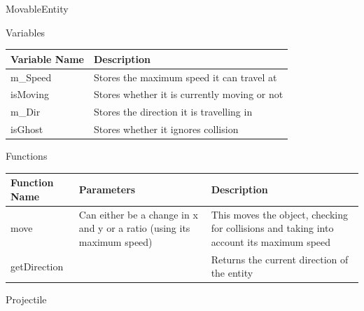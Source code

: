 \documentclass{article}
\begin{document}
                MovableEntity
                \begin{center}
                    Variables
                    \begin{tabular}{ | m{} | m{} | }
                        \hline
                        \textbf{Variable Name} & \textbf{Description} \\
                        \hline
                        m\_Speed & Stores the maximum speed it can travel at \\
                        \hline
                        isMoving & Stores whether it is currently moving or not \\
                        \hline
                        m\_Dir & Stores the direction it is travelling in \\
                        \hline
                        isGhost & Stores whether it ignores collision \\
                        \hline
                    \end{tabular}
                    Functions
                    \begin{tabular}{ | m{} | m{}| m{} | }
                        \hline
                        \textbf{Function Name} & \textbf{Parameters} & \textbf{Description} \\
                        \hline
                        move & Can either be a change in x and y or a ratio (using its maximum speed) & This moves the object, checking for collisions and taking into account its maximum speed \\
                        \hline
                        getDirection & & Returns the current direction of the entity \\
                        \hline
                    \end{tabular}
                \end{center}
                Projectile %
\end{document}
